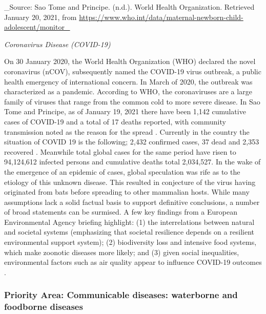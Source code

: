 \documentclass[
]{book}
\begin{document}
\_Source: Sao Tome and Principe. (n.d.). World Health Organization. Retrieved January 20, 2021, from \url{https://www.who.int/data/maternal-newborn-child-adolescent/monitor_}

\emph{Coronavirus Disease (COVID-19)}

On 30 January 2020, the World Health Organization (WHO) declared the novel coronavirus (nCOV), subsequently named the COVID-19 virus outbreak, a public health emergency of international concern. In March of 2020, the outbreak was characterized as a pandemic. According to WHO, the coronaviruses are a large family of viruses that range from the common cold to more severe disease. In Sao Tome and Principe, as of January 19, 2021 there have been 1,142 cumulative cases of COVID-19 and a total of 17 deaths reported, with community transmission noted as the reason for the spread . Currently in the country the situation of COVID 19 is the following; 2,432 confirmed cases, 37 dead and 2,353 recovered . Meanwhile total global cases for the same period have risen to 94,124,612 infected persons and cumulative deaths total 2,034,527. In the wake of the emergence of an epidemic of cases, global speculation was rife as to the etiology of this unknown disease. This resulted in conjecture of the virus having originated from bats before spreading to other mammalian hosts. While many assumptions lack a solid factual basis to support definitive conclusions, a number of broad statements can be surmised. A few key findings from a European Environmental Agency briefing highlight: (1) the interrelations between natural and societal systems (emphasizing that societal resilience depends on a resilient environmental support system); (2) biodiversity loss and intensive food systems, which make zoonotic diseases more likely; and (3) given social inequalities, environmental factors such as air quality appear to influence COVID-19 outcomes .

\hypertarget{priority-area-communicable-diseases-waterborne-and-foodborne-diseases-1}{%
\subsubsection{Priority Area: Communicable diseases: waterborne and foodborne diseases}\label{priority-area-communicable-diseases-waterborne-and-foodborne-diseases-1}}
\end{document}
